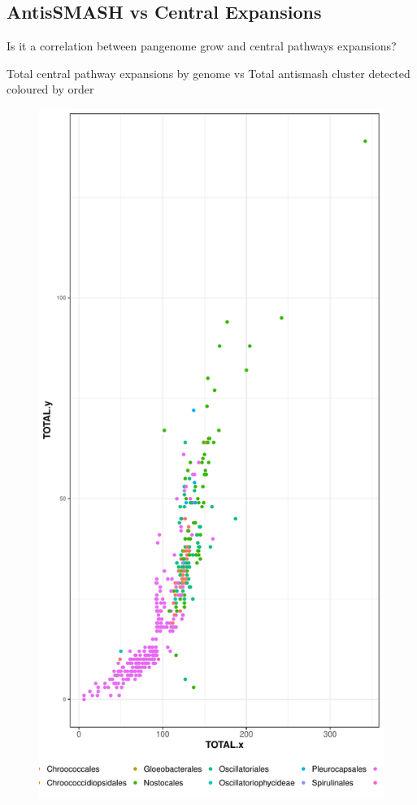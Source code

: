 \documentclass[12pt,twoside]{reedthesis}
\begin{document}
  \subsection{AntisSMASH vs Central
  Expansions}\label{antissmash-vs-central-expansions-2}
  
  Is it a correlation between pangenome grow and central pathways
  expansions?
  
  Total central pathway expansions by genome vs Total antismash cluster
  detected coloured by order
  
  \begin{figure}[h!tbp]
  \centering
  \includegraphics[angle = 0,scale = 0.5]{chapter5/SMASHvsExpansionsbyOrder.pdf}

\end{figure}
\end{document}
